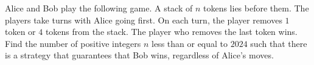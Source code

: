 Alice and Bob play the following game. A stack of $n$ tokens lies before them. The players take turns with Alice going first. On each turn, the player removes $1$ token or $4$ tokens from the stack. The player who removes the last token wins. Find the number of positive integers $n$ less than or equal to $2024$ such that there is a strategy that guarantees that Bob wins, regardless of Alice’s moves.
